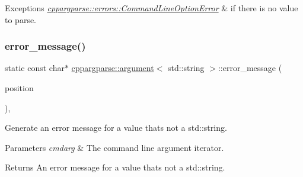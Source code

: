 \begin{DoxyExceptions}{Exceptions}
{\em \hyperlink{classcppargparse_1_1errors_1_1CommandLineOptionError}{cppargparse\+::errors\+::\+Command\+Line\+Option\+Error}} & if there is no value to parse. \\
\hline
\end{DoxyExceptions}
\mbox{\label{structcppargparse_1_1argument_3_01std_1_1string_01_4_abf0e56694e3cb65b632759217de194f1}} 
\subsubsection{\texorpdfstring{error\+\_\+message()}{error\_message()}}
{\footnotesize\ttfamily static const char$\ast$ \hyperlink{structcppargparse_1_1argument}{cppargparse\+::argument}$<$ std\+::string $>$\+::error\+\_\+message (\begin{DoxyParamCaption}\item[{const types\+::\+Command\+Line\+Position\+\_\+t \&}]{position }\end{DoxyParamCaption})\hspace{0.3cm}{\ttfamily [inline]}, {\ttfamily [static]}}



Generate an error message for a value that\textquotesingle{}s not a std\+::string. 


\begin{DoxyParams}{Parameters}
{\em cmdarg} & The command line argument iterator.\\
\hline
\end{DoxyParams}
\begin{DoxyReturn}{Returns}
An error message for a value that\textquotesingle{}s not a std\+::string. 
\end{DoxyReturn}
\mbox{\label{structcppargparse_1_1argument_3_01std_1_1string_01_4_af0b5a5adbfd58ee818f46f5d42f6f36d}} 
